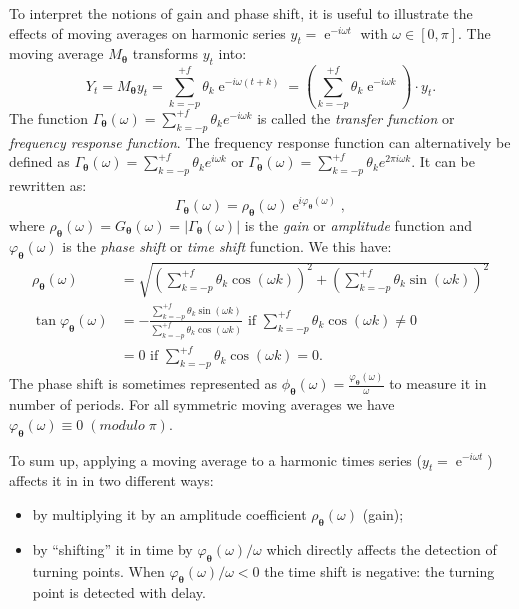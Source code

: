 \documentclass[
]{article}
\DeclareMathOperator{\e}{e}
\newcommand\1{\mathds{1}}
\begin{document}
To interpret the notions of gain and phase shift, it is useful to
illustrate the effects of moving averages on harmonic series
\(y_t=\e^{-i\omega t}\) with \(\omega\in[0,\pi]\). The moving average
\(M_{\boldsymbol\theta}\) transforms \(y_t\) into: \[
Y_t = M_{\boldsymbol\theta}y_t = \sum_{k=-p}^{+f} \theta_k \e^{-i \omega (t+k)}
= \left(\sum_{k=-p}^{+f} \theta_k \e^{-i \omega k}\right)\cdot y_t.
\] The function
\(\Gamma_{\boldsymbol\theta}(\omega)=\sum_{k=-p}^{+f} \theta_k e^{-i \omega k}\)
is called the \emph{transfer function} or \emph{frequency response
function}. The frequency response function can alternatively be defined
as
\(\Gamma_{\boldsymbol\theta}(\omega)=\sum_{k=-p}^{+f} \theta_k e^{i \omega k}\)
or
\(\Gamma_{\boldsymbol\theta}(\omega)=\sum_{k=-p}^{+f} \theta_k e^{2\pi i \omega k}\).
It can be rewritten as: \[
\Gamma_{\boldsymbol\theta}(\omega) = \rho_{\boldsymbol\theta}(\omega)\e^{i\varphi_{\boldsymbol\theta}(\omega)},
\] where
\(\rho_{\boldsymbol\theta}(\omega)=G_{\boldsymbol\theta}(\omega)=\lvert\Gamma_{\boldsymbol\theta}(\omega)\rvert\)
is the \emph{gain} or \emph{amplitude} function and
\(\varphi_{\boldsymbol\theta}(\omega)\) is the \emph{phase shift} or
\emph{time shift} function. We this have: \begin{align*}
\rho_{\boldsymbol\theta}(\omega) &=\sqrt{\left(\sum_{k=-p}^{+f}\theta_k\cos(\omega k)\right)^2+
\left(\sum_{k=-p}^{+f}\theta_k\sin(\omega k)\right)^2} \\
\tan \varphi_{\boldsymbol\theta}(\omega) &=- \frac{\sum_{k=-p}^{+f}\theta_k\sin(\omega k)}{\sum_{k=-p}^{+f}\theta_k\cos(\omega k)} \text{ if }\sum_{k=-p}^{+f}\theta_k\cos(\omega k) \ne 0 \\
&= 0 \text{ if }\sum_{k=-p}^{+f}\theta_k\cos(\omega k) = 0.
\end{align*} The phase shift is sometimes represented as
\(\phi_{\boldsymbol\theta}(\omega)=\frac{\varphi_{\boldsymbol\theta}(\omega)}{\omega}\)
to measure it in number of periods. For all symmetric moving averages we
have \(\varphi_{\boldsymbol\theta}(\omega)\equiv 0 \;(modulo\;{\pi})\).

To sum up, applying a moving average to a harmonic times series
(\(y_t=\e^{-i\omega t}\)) affects it in in two different ways:

\begin{itemize}
\item
  by multiplying it by an amplitude coefficient
  \(\rho_{\boldsymbol\theta}\left(\omega\right)\) (gain);
\item
  by ``shifting'' it in time by
  \(\varphi_{\boldsymbol\theta}(\omega)/\omega\) which directly affects
  the detection of turning points. When
  \(\varphi_{\boldsymbol\theta}(\omega)/\omega<0\) the time shift is
  negative: the turning point is detected with delay.
\end{itemize}
\end{document}
